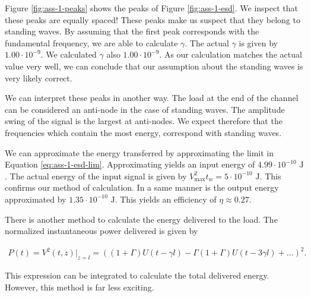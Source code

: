 \documentclass[11pt,titlepage]{report}
\begin{document}
Figure \ref{fig:ass-1-peaks} shows the peaks of Figure \ref{fig:ass-1-esd}. We inspect that these peaks are equally spaced! These peaks make us suspect that they belong to standing waves. By assuming that the first peak corresponds with the fundamental frequency, we are able to calculate $\gamma$. The actual $\gamma$ is given by $1.00 \cdot 10^{-9}$. We calculated $\gamma$ also $1.00 \cdot 10^{-9}$. As our calculation matches the actual value very well, we can conclude that our assumption about the standing waves is very likely correct.

We can interpret these peaks in another way. The load at the end of the channel can be considered an anti-node in the case of standing waves. The amplitude swing of the signal is the largest at anti-nodes. We expect therefore that the frequencies which contain the most energy, correspond with standing waves.

We can approximate the energy transferred by approximating the limit in Equation \ref{eq:ass-1-esd-lim}. Approximating yields an input energy of $4.99 \cdot 10^{-10} \text{ J}$. The actual energy of the input signal is given by $V_{\text{max}}^2 t_w =5 \cdot 10^{-10} \text{ J}$. This confirms our method of calculation. In a same manner is the output energy approximated by $1.35 \cdot 10^{-10} \text{ J}$. This yields an efficiency of $\eta\approx0.27$.

There is another method to calculate the energy delivered to the load. The normalized instantaneous power delivered is given by

\begin{align}
	P(t)=V^2(t,z)|_{z=l}=\left((1+\Gamma)U(t- \gamma l) - \Gamma (1+ \Gamma) U(t - 3 \gamma  l) + \dots\right)^2.
\end{align}

This expression can be integrated to calculate the total delivered energy. However, this method is far less exciting.
\end{document}
